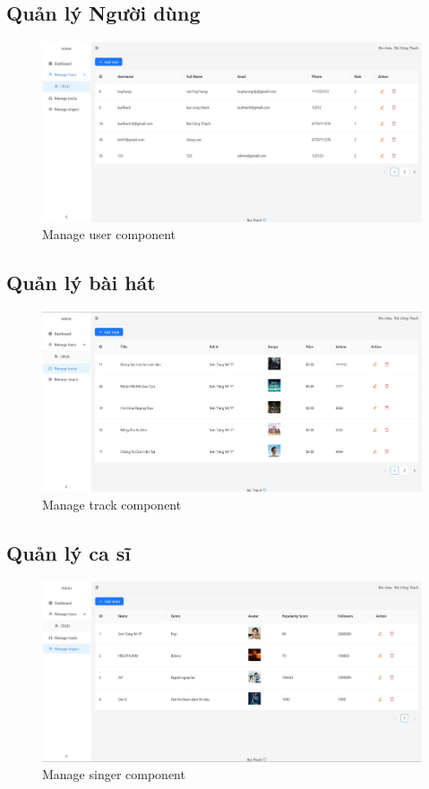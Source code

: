 \documentclass[a4paper]{article}
\begin{document}
\subsection{Quản lý Người dùng}
\begin{figure}[H]
    \centering
    \includegraphics[width=1\linewidth]{img/User.png}
    \caption{Manage user component}
    \label{fig:enter-label}
\end{figure}

\subsection{Quản lý bài hát}
\begin{figure}[H]
    \centering
    \includegraphics[width=1\linewidth]{img/tracks.png}
    \caption{Manage track component}
    \label{fig:enter-label}
\end{figure}

\subsection{Quản lý ca sĩ}
\begin{figure}[H]
    \centering
    \includegraphics[width=1\linewidth]{img/singer.png}
    \caption{Manage singer component}
    \label{fig:enter-label}
\end{figure}
\end{document}
